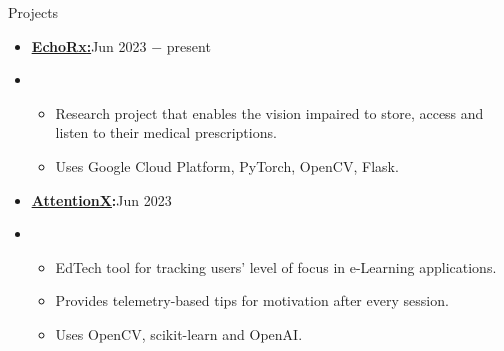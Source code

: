 \documentclass{resume}
\begin{document}
\vspace{-0.5\baselineskip}


\begin{rSection}{Projects}
    \begin{itemize}[label=\null, leftmargin=*, parsep=0.5em]
        \item {
              \textbf{\href{https://github.com/AdwayB/EchoRx}{\underline{EchoRx}:}}\hfill Jun 2023 $-$ present
              } \\
        \item {
              \vspace{-1.2\baselineskip}
              \begin{itemize}[label=$\bullet$]
                  \vspace{-\parskip}
                  \vspace{-\parsep}
                  \item {
                        Research project that enables the vision impaired to store, access and listen to their medical prescriptions.
                        }
                  \item {
                        Uses Google Cloud Platform, PyTorch, OpenCV, Flask.
                        }
              \end{itemize}
              }



        \item {
              \textbf{\href{https://github.com/AdwayB/AttentionX}{ \underline{AttentionX}}:}\hfill Jun 2023
              } \\
        \item {
              \vspace{-1.2\baselineskip}
              \begin{itemize}[label=$\bullet$]
                  \vspace{-\parskip}
                  \vspace{-\parsep}
                  \item {
                        EdTech tool for tracking users' level of focus in e-Learning applications.
                        }
                  \item {
                        Provides telemetry-based tips for motivation after every session.
                        }
                  \item {
                        Uses OpenCV, scikit-learn and OpenAI.\@
                        }
              \end{itemize}
              }




\end{itemize}
\end{rSection}
\end{document}
